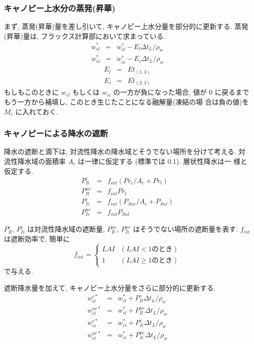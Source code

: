 \subsubsection{キャノピー上水分の蒸発(昇華)}

まず, 蒸発(昇華)量を差し引いて, キャノピー上水分量を部分的に更新する. 
蒸発(昇華)量は, フラックス計算部において求まっている. 
\begin{eqnarray}
 w_{cl}^* &=& w_{cl}^{\tau} - E_l \Delta t_L / \rho_w \\
 w_{ci}^* &=& w_{ci}^{\tau} - E_i \Delta t_L / \rho_w 
\end{eqnarray}
\begin{eqnarray}
 E_l &=& Et_{(1,3)} \\
 E_i &=& Et_{(2,3)} 
\end{eqnarray}
もしもこのときに $w_{cl}$ もしくは $w_{ci}$ の一方が負になった場合, 値が
0 に戻るまでもう一方から補填し, このとき生じたことになる融解量(凍結の場
合は負の値)を $M_c$ に入れておく. 

\subsubsection{キャノピーによる降水の遮断}

降水の遮断と滴下は, 対流性降水の降水域とそうでない場所を分けて考える. 対
流性降水域の面積率 $A_c$ は一律に仮定する (標準では 0.1). 層状性降水は一
様と仮定する. 
\begin{eqnarray}
 P_{Il}^{c}  &=& f_{int} ( Pr_c / A_c + Pr_l ) \\
 P_{Il}^{nc} &=& f_{int} Pr_l \\
 P_{Ii}^{c}  &=& f_{int} ( P_{Snc} / A_c + P_{Snl} ) \\
 P_{Ii}^{nc} &=& f_{int} P_{Snl}
\end{eqnarray}

$P_{Il}^{c}$, $P_{Ii}^{c}$ は対流性降水域の遮断量, $P_{Il}^{nc}$,
$P_{Ii}^{nc}$ はそうでない場所の遮断量を表す. 
$f_{int}$ は遮断効率で, 簡単に
\begin{equation}
 f_{int} = \left\{
\begin{array}{ll}
 LAI & (LAI < 1 \mbox{のとき})\\
 1   & (LAI \geq 1 \mbox{のとき})
\end{array}
\right.
\end{equation}
で与える. 

遮断降水量を加えて, キャノピー上水分量をさらに部分的に更新する. 
\begin{eqnarray}
 w_{cl}^{c*} &=& w_{cl}^*  + P_{Il}^c    \Delta t_L / \rho_w \\
 w_{cl}^{nc*}&=& w_{cl}^*  + P_{Il}^{nc} \Delta t_L / \rho_w \\
 w_{ci}^{c*} &=& w_{ci}^*  + P_{Ii}^c    \Delta t_L / \rho_w \\
 w_{ci}^{nc*}&=& w_{ci}^*  + P_{Ii}^{nc} \Delta t_L / \rho_w 
\end{eqnarray}

